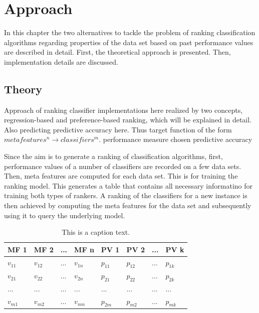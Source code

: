 %
\chapter{Approach}
\label{sec:approach}

In this chapter the two alternatives to tackle the problem of ranking classification algorithms regarding properties of the data set based on past performance values are described in detail. First, the theoretical approach is presented. Then, implementation details are discussed.

\section{Theory}

Approach of ranking classifier implementations here realized by two concepts, regression-based and preference-based ranking, which will be explained in detail. Also predicting predictive accuracy here. Thus target function of the form $meta features^n \rightarrow classifiers^m$.
performance measure chosen predictive accuracy

Since the aim is to generate a ranking of classification algorithms, first, performance values of a number of classifiers are recorded on a few data sets. Then, meta features are computed for each data set. This is for training the ranking model. This generates a table that contains all necessary informatino for training both types of rankers. A ranking of the classifiers for a new instance is then achieved by computing the meta features for the data set and subsequently using it to query the underlying model. 

\begin{table}[h]
\centering
	\begin{tabularx}{\textwidth}{X | X | X | X | X | X | X | X}
		MF 1			& MF 2		& ... 	& MF n		& PV 1 		& PV 2 		&	...	&	PV k 		\\ \hline
		$v_{11}$		& $v_{12}$	& ...	& $v_{1n}$	& $p_{11}$	& $p_{12}$	& 	...	&	$p_{1k}$		\\ \hline
		$v_{21}$		& $v_{22}$	& ...	& $v_{2n}$	& $p_{21}$	& $p_{22}$	& 	...	&	$p_{2k}$		\\ \hline
		...			& ...		& ...	& ...		& ...		& ...		&	...	&	...			\\ \hline
		$v_{m1}$		& $v_{m2}$	& ... 	& $v_{mn}$	& $p_{2m}$	& $p_{m2}$	& 	...	&	$p_{mk}$			 
	\end{tabularx}
	\label{tab:table1}
	\caption{This is a caption text.}
\end{table}

